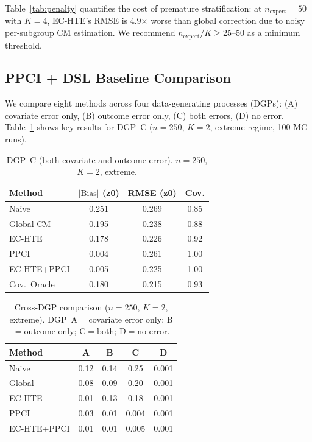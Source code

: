 \documentclass[11pt,twocolumn]{article}
\begin{document}
Table~\ref{tab:penalty} quantifies the cost of premature stratification: at $n_{\text{expert}}{=}50$ with $K{=}4$, EC-HTE's RMSE is 4.9$\times$ worse than global correction due to noisy per-subgroup CM estimation. We recommend $n_{\text{expert}}/K \geq 25$--50 as a minimum threshold.

\subsection{PPCI + DSL Baseline Comparison}
\label{sec:ppci}

We compare eight methods across four data-generating processes (DGPs): (A) covariate error only, (B) outcome error only, (C) both errors, (D) no error. Table~\ref{tab:dgpc} shows key results for DGP~C ($n{=}250$, $K{=}2$, extreme regime, 100 MC runs).

\begin{table}[t]
\centering
\small
\caption{DGP~C (both covariate and outcome error). $n{=}250$, $K{=}2$, extreme.}
\label{tab:dgpc}
\begin{tabular}{@{}lccc@{}}
\toprule
Method & $|\text{Bias}|$ (z0) & RMSE (z0) & Cov. \\
\midrule
Naive & 0.251 & 0.269 & 0.85 \\
Global CM & 0.195 & 0.238 & 0.88 \\
EC-HTE & 0.178 & 0.226 & 0.92 \\
PPCI & 0.004 & 0.261 & 1.00 \\
EC-HTE+PPCI & 0.005 & 0.225 & 1.00 \\
Cov.\ Oracle & 0.180 & 0.215 & 0.93 \\
\bottomrule
\end{tabular}
\end{table}

\begin{table}[t]
\centering
\small
\caption{Cross-DGP comparison ($n{=}250$, $K{=}2$, extreme). DGP~A$=$covariate error only; B$=$outcome only; C$=$both; D$=$no error.}
\label{tab:crossdgp}
\begin{tabular}{@{}lcccc@{}}
\toprule
Method & A & B & C & D \\
\midrule
Naive & 0.12 & 0.14 & 0.25 & 0.001 \\
Global & 0.08 & 0.09 & 0.20 & 0.001 \\
EC-HTE & 0.01 & 0.13 & 0.18 & 0.001 \\
PPCI & 0.03 & 0.01 & 0.004 & 0.001 \\
EC-HTE+PPCI & 0.01 & 0.01 & 0.005 & 0.001 \\
\bottomrule
\end{tabular}
\end{table}
\end{document}
